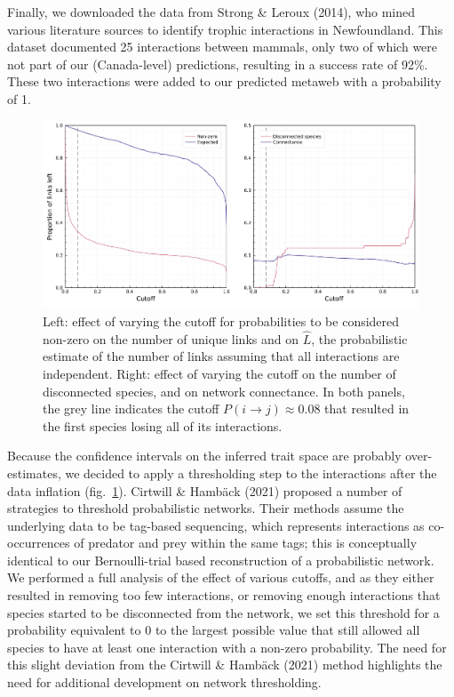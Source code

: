 \documentclass[10pt,oneside]{article}
\makeatletter
\def\maxwidth{\ifdim\Gin@nat@width>\linewidth\linewidth
\else\Gin@nat@width\fi}
\let\Oldincludegraphics\includegraphics
\renewcommand{\includegraphics}[1]{\Oldincludegraphics[width=\maxwidth]{#1}}
\makeatother
\begin{document}
Finally, we downloaded the data from Strong \& Leroux (2014), who mined
various literature sources to identify trophic interactions in
Newfoundland. This dataset documented 25 interactions between mammals,
only two of which were not part of our (Canada-level) predictions,
resulting in a success rate of 92\%. These two interactions were added
to our predicted metaweb with a probability of 1.

\begin{figure}
\hypertarget{fig:thresholds}{%
\centering
\includegraphics{figures/figure-cutoffs.png}
\caption{Left: effect of varying the cutoff for probabilities to be
considered non-zero on the number of unique links and on \(\hat{L}\),
the probabilistic estimate of the number of links assuming that all
interactions are independent. Right: effect of varying the cutoff on the
number of disconnected species, and on network connectance. In both
panels, the grey line indicates the cutoff
\(P(i\rightarrow j) \approx 0.08\) that resulted in the first species
losing all of its interactions.}\label{fig:thresholds}
}
\end{figure}

Because the confidence intervals on the inferred trait space are
probably over-estimates, we decided to apply a thresholding step to the
interactions after the data inflation (fig.~\ref{fig:thresholds}).
Cirtwill \& Hambäck (2021) proposed a number of strategies to threshold
probabilistic networks. Their methods assume the underlying data to be
tag-based sequencing, which represents interactions as co-occurrences of
predator and prey within the same tags; this is conceptually identical
to our Bernoulli-trial based reconstruction of a probabilistic network.
We performed a full analysis of the effect of various cutoffs, and as
they either resulted in removing too few interactions, or removing
enough interactions that species started to be disconnected from the
network, we set this threshold for a probability equivalent to 0 to the
largest possible value that still allowed all species to have at least
one interaction with a non-zero probability. The need for this slight
deviation from the Cirtwill \& Hambäck (2021) method highlights the need
for additional development on network thresholding.
\end{document}
